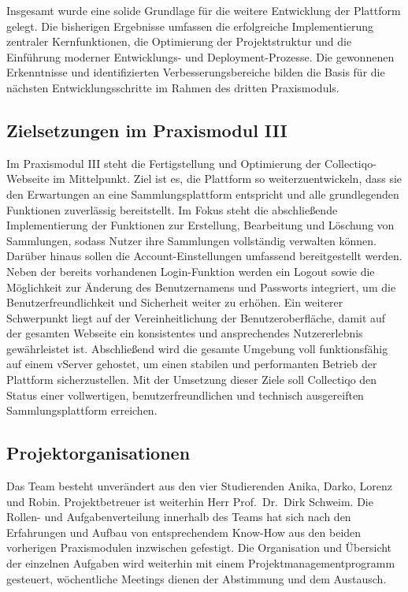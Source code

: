 Insgesamt wurde eine solide Grundlage für die weitere Entwicklung der Plattform gelegt.
Die bisherigen Ergebnisse umfassen die erfolgreiche Implementierung zentraler Kernfunktionen, die Optimierung der Projektstruktur und die Einführung moderner Entwicklungs- und Deployment-Prozesse.
Die gewonnenen Erkenntnisse und identifizierten Verbesserungsbereiche bilden die Basis für die nächsten Entwicklungsschritte im Rahmen des dritten Praxismoduls.

\subsection{Zielsetzungen im Praxismodul III}\label{subsec:subsection-one-two}

Im Praxismodul III steht die Fertigstellung und Optimierung der Collectiqo-Webseite im Mittelpunkt.
Ziel ist es, die Plattform so weiterzuentwickeln, dass sie den Erwartungen an eine Sammlungsplattform entspricht und alle grundlegenden Funktionen zuverlässig bereitstellt.
Im Fokus steht die abschließende Implementierung der Funktionen zur Erstellung, Bearbeitung und Löschung von Sammlungen, sodass Nutzer ihre Sammlungen vollständig verwalten können.
Darüber hinaus sollen die Account-Einstellungen umfassend bereitgestellt werden.
Neben der bereits vorhandenen Login-Funktion werden ein Logout sowie die Möglichkeit zur Änderung des Benutzernamens und Passworts integriert, um die Benutzerfreundlichkeit und Sicherheit weiter zu erhöhen.
Ein weiterer Schwerpunkt liegt auf der Vereinheitlichung der Benutzeroberfläche, damit auf der gesamten Webseite ein konsistentes und ansprechendes Nutzererlebnis gewährleistet ist.
Abschließend wird die gesamte Umgebung voll funktionsfähig auf einem vServer gehostet, um einen stabilen und performanten Betrieb der Plattform sicherzustellen.
Mit der Umsetzung dieser Ziele soll Collectiqo den Status einer vollwertigen, benutzerfreundlichen und technisch ausgereiften Sammlungsplattform erreichen.

\subsection{Projektorganisationen}\label{subsec:subsection-one-three}

Das Team besteht unverändert aus den vier Studierenden Anika, Darko, Lorenz und Robin.
Projektbetreuer ist weiterhin Herr Prof.\, Dr.\, Dirk Schweim.
Die Rollen- und Aufgabenverteilung innerhalb des Teams hat sich nach den Erfahrungen und Aufbau von entsprechendem Know-How aus den beiden vorherigen Praxismodulen inzwischen gefestigt.
Die Organisation und Übersicht der einzelnen Aufgaben wird weiterhin mit einem Projektmanagementprogramm gesteuert, wöchentliche Meetings dienen der Abstimmung und dem Austausch.

